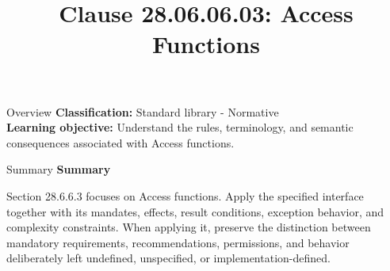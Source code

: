 \documentclass[10pt,letterpaper]{article}
\title{Clause 28.06.06.03: Access Functions}
\author{}
\date{}
\begin{document}
\maketitle
\begin{CornellOverviewBox}{Overview}
\textbf{Classification:} Standard library - Normative\\[2pt]
\textbf{Learning objective:} Understand the rules, terminology, and semantic consequences associated with Access functions.
\end{CornellOverviewBox}\begin{CornellSummaryBox}{Summary}
{\sffamily\bfseries\color{Accent} Summary}\par\vspace{3pt}Section 28.6.6.3 focuses on Access functions. Apply the specified interface together with its mandates, effects, result conditions, exception behavior, and complexity constraints. When applying it, preserve the distinction between mandatory requirements, recommendations, permissions, and behavior deliberately left undefined, unspecified, or implementation-defined.
\end{CornellSummaryBox}
\end{document}
